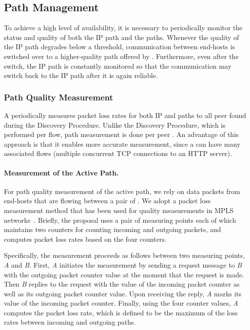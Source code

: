 \subsection{Path Management}
\label{subsection:path_management}

To achieve a high level of availability, it is necessary to periodically
monitor the status and quality of both the IP path and the \scion paths.
Whenever the quality of the IP path degrades below a threshold, communication
between end-hosts is switched over to a higher-quality path offered by \scion.
Furthermore, even after the switch, the IP path is constantly monitored so that
the communication may switch back to the IP path after it is again reliable.

\subsubsection{Path Quality Measurement}
\label{subsubsection:path_measurement}

A \name periodically measures packet loss rates for both IP and \scion paths to
all peer \names found during the \name Discovery Procedure. Unlike the \name
Discovery Procedure, which is performed per flow, path measurement is done per
peer \name.  An advantage of this approach is that it enables more accurate
measurement, since a \name can have many associated flows (\eg multiple
concurrent TCP connections to an HTTP server).

\paragraph{Measurement of the Active Path.} For path quality measurement of the
active path, we rely on data packets from end-hosts that are flowing between a
pair of \names. We adopt a packet loss measurement method that has been used
for quality measurements in MPLS networks~\cite{rfc6374}. Briefly, the proposal
uses a pair of measuring points each of which maintains two counters for
counting incoming and outgoing packets, and computes packet loss rates based on
the four counters.

Specifically, the measurement proceeds as follows between two measuring points,
\textit{A} and \textit{B}. First, \textit{A} initiates the measurement by
sending a request message to \textit{B} with the outgoing packet counter value
at the moment that the request is made. Then \textit{B} replies to the request
with the value of the incoming packet counter as well as its outgoing packet
counter value. Upon receiving the reply, \textit{A} marks its value of the
incoming packet counter. Finally, using the four counter values, \textit{A}
computes the packet loss rate, which is defined to be the maximum of the loss
rates between incoming and outgoing paths.

